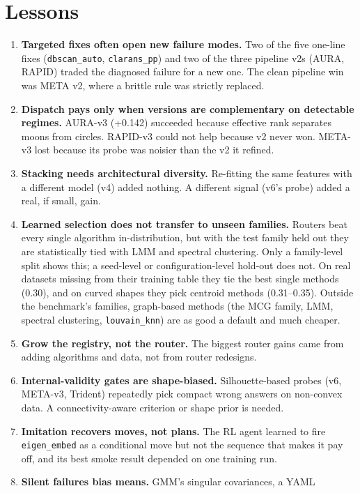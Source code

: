 \documentclass[11pt,a4paper]{article}
\newcommand{\code}[1]{\texttt{#1}}
\begin{document}
\section{Lessons}\label{sec:lessons}
\begin{enumerate}
  \item \textbf{Targeted fixes often open new failure modes.} Two of the five
  one-line fixes (\code{dbscan\_auto}, \code{clarans\_pp}) and two of the three
  pipeline v2s (AURA, RAPID) traded the diagnosed failure for a new one. The
  clean pipeline win was META v2, where a brittle rule was strictly replaced.
  \item \textbf{Dispatch pays only when versions are complementary on
  detectable regimes.} AURA-v3 (+0.142) succeeded because effective rank
  separates moons from circles. RAPID-v3 could not help because v2 never won.
  META-v3 lost because its probe was noisier than the v2 it refined.
  \item \textbf{Stacking needs architectural diversity.} Re-fitting the same
  features with a different model (v4) added nothing. A different signal (v6's
  probe) added a real, if small, gain.
  \item \textbf{Learned selection does not transfer to unseen families.} Routers
  beat every single algorithm in-distribution, but with the test family held
  out they are statistically tied with LMM and spectral clustering. Only a
  family-level split shows this; a seed-level or configuration-level hold-out
  does not. On real datasets missing from their training table they tie the
  best single methods (0.30), and on curved shapes they pick centroid methods
  (0.31--0.35). Outside the benchmark's families, graph-based methods (the
  MCG family, LMM, spectral clustering, \code{louvain\_knn}) are as good a
  default and much cheaper.
  \item \textbf{Grow the registry, not the router.} The biggest router gains
  came from adding algorithms and data, not from router redesigns.
  \item \textbf{Internal-validity gates are shape-biased.} Silhouette-based
  probes (v6, META-v3, Trident) repeatedly pick compact wrong answers on
  non-convex data. A connectivity-aware criterion or shape prior is needed.
  \item \textbf{Imitation recovers moves, not plans.} The RL agent learned to
  fire \code{eigen\_embed} as a conditional move but not the sequence that
  makes it pay off, and its best smoke result depended on one training run.
  \item \textbf{Silent failures bias means.} GMM's singular covariances, a YAML

\end{enumerate}
\end{document}
